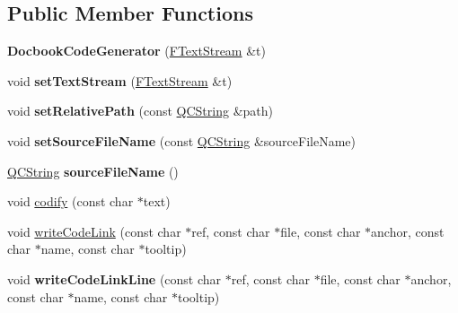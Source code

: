 \subsection*{Public Member Functions}
\begin{DoxyCompactItemize}
\item 
\mbox{\label{class_docbook_code_generator_a614697e6789639f7e8b67a7ba2ac31d3}} 
{\bfseries Docbook\+Code\+Generator} (\mbox{\hyperlink{class_f_text_stream}{F\+Text\+Stream}} \&t)
\item 
\mbox{\label{class_docbook_code_generator_ad6d433d950d9c74b83a8028e4c6624cd}} 
void {\bfseries set\+Text\+Stream} (\mbox{\hyperlink{class_f_text_stream}{F\+Text\+Stream}} \&t)
\item 
\mbox{\label{class_docbook_code_generator_a831a2985374b5c317e9778c12f4fc7b4}} 
void {\bfseries set\+Relative\+Path} (const \mbox{\hyperlink{class_q_c_string}{Q\+C\+String}} \&path)
\item 
\mbox{\label{class_docbook_code_generator_ab6e2bf360ffa9f8f14c457405273d4c0}} 
void {\bfseries set\+Source\+File\+Name} (const \mbox{\hyperlink{class_q_c_string}{Q\+C\+String}} \&source\+File\+Name)
\item 
\mbox{\label{class_docbook_code_generator_ab495ebcb45b5e583da811c8d7d02599a}} 
\mbox{\hyperlink{class_q_c_string}{Q\+C\+String}} {\bfseries source\+File\+Name} ()
\item 
void \mbox{\hyperlink{class_docbook_code_generator_a7c2c177e3e6e0485e9806a75b45bd7a3}{codify}} (const char $\ast$text)
\item 
void \mbox{\hyperlink{class_docbook_code_generator_aecf4ade98ac3d63f22e3632f7dfb987a}{write\+Code\+Link}} (const char $\ast$ref, const char $\ast$file, const char $\ast$anchor, const char $\ast$name, const char $\ast$tooltip)
\item 
\mbox{\label{class_docbook_code_generator_ac9765bca8082ebc6991611cc3e9d0368}} 
void {\bfseries write\+Code\+Link\+Line} (const char $\ast$ref, const char $\ast$file, const char $\ast$anchor, const char $\ast$name, const char $\ast$tooltip)
\item 

\end{DoxyCompactItemize}
